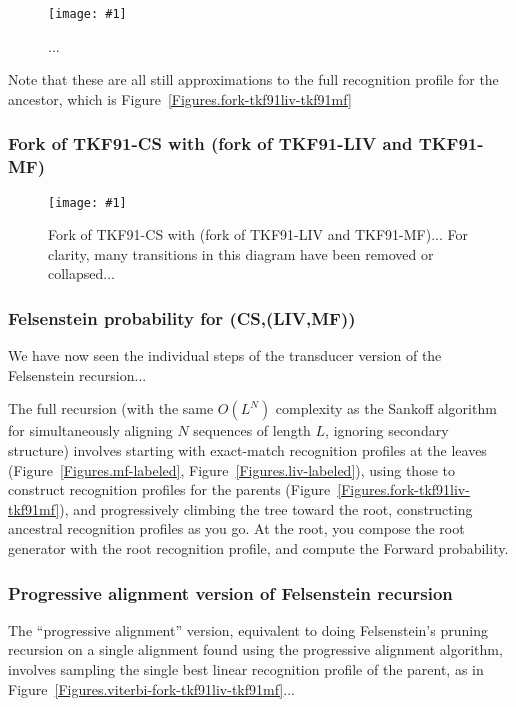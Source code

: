 \documentclass{article}
\newcommand{\figref}[1]{Figure~\ref{Figures.#1}}
\newcommand{\figlabel}[1]{\label{Figures.#1}}
\newcommand{\easyfig}[4]{
\begin{figure}
\texttt{[image: \#1]}
\caption{ \figlabel{#3} #4}
\end{figure}}
\newcommand{\widepngfig}[2]{\easyfig{#1.png}{width=\textwidth}{#1}{#2}}
\newcommand{\tallpdffig}[2]{\easyfig{#1-fig.pdf}{height=\textheight}{#1}{#2}}
\newcommand{\needfig}[1]{{\bf Need figure: } #1 }
\begin{document}
\tallpdffig{forward2-profile}{...}

Note that these are all still approximations to the full
recognition profile for the ancestor, which is \figref{fork-tkf91liv-tkf91mf}

\subsubsection{Fork of TKF91-CS with (fork of TKF91-LIV and TKF91-MF)}

\widepngfig{fork3-tkf91liv-tkf91mf-tkf91cs}
{Fork of TKF91-CS with (fork of TKF91-LIV and TKF91-MF)...
For clarity, many transitions in this diagram have been removed or collapsed...
}

\subsubsection{Felsenstein probability for (CS,(LIV,MF))}


We have now seen the individual steps of the transducer version of the Felsenstein recursion...

The full recursion (with the same $O(L^N)$ complexity as the Sankoff algorithm
for simultaneously aligning $N$ sequences of length $L$, ignoring secondary structure)
involves starting with exact-match recognition profiles at the leaves (\figref{mf-labeled}, \figref{liv-labeled}),
using those to construct recognition profiles for the parents (\figref{fork-tkf91liv-tkf91mf}),
and progressively climbing the tree toward the root,
constructing ancestral recognition profiles as you go.
At the root, you compose the root generator with the root recognition profile,
and compute the Forward probability.

\subsubsection{Progressive alignment version of Felsenstein recursion}

The ``progressive alignment'' version,
equivalent to doing Felsenstein's pruning recursion on a single alignment
found using the progressive alignment algorithm,
involves sampling the single best linear recognition profile of the parent,
as in \figref{viterbi-fork-tkf91liv-tkf91mf}...
\end{document}
